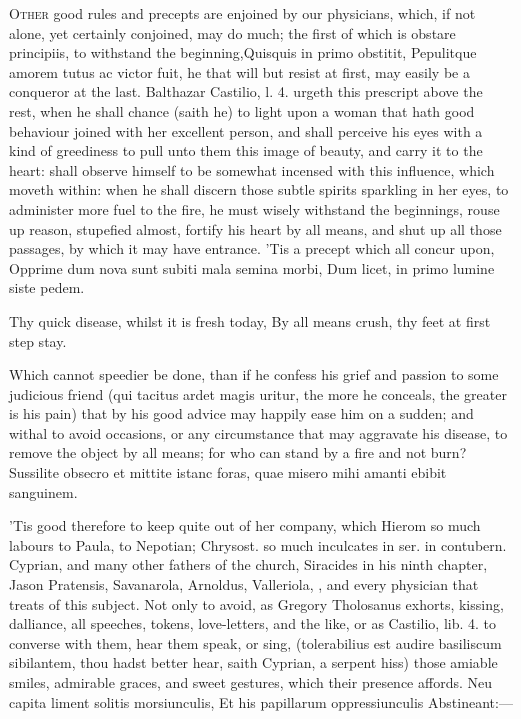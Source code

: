 {\lettrine{O}{ther} good rules and precepts are enjoined by our physicians, which, if
not alone, yet certainly conjoined, may do much; the first of which is
obstare principiis, to withstand the beginning,Quisquis in primo
obstitit, Pepulitque amorem tutus ac victor fuit, he that will but
resist at first, may easily be a conqueror at the last. Balthazar
Castilio, l. 4. urgeth this prescript above the rest, when he
shall chance (saith he) to light upon a woman that hath good behaviour
joined with her excellent person, and shall perceive his eyes with a
kind of greediness to pull unto them this image of beauty, and carry it
to the heart: shall observe himself to be somewhat incensed with this
influence, which moveth within: when he shall discern those subtle
spirits sparkling in her eyes, to administer more fuel to the fire, he
must wisely withstand the beginnings, rouse up reason, stupefied
almost, fortify his heart by all means, and shut up all those passages,
by which it may have entrance. 'Tis a precept which all concur upon,
Opprime dum nova sunt subiti mala semina morbi,
Dum licet, in primo lumine siste pedem.

Thy quick disease, whilst it is fresh today,
By all means crush, thy feet at first step stay.

Which cannot speedier be done, than if he confess his grief and passion
to some judicious friend (qui tacitus ardet magis uritur, the
more he conceals, the greater is his pain) that by his good advice may
happily ease him on a sudden; and withal to avoid occasions, or any
circumstance that may aggravate his disease, to remove the object by
all means; for who can stand by a fire and not burn?
Sussilite obsecro et mittite istanc foras,
quae misero mihi amanti ebibit sanguinem.

'Tis good therefore to keep quite out of her company, which Hierom so
much labours to Paula, to Nepotian; Chrysost. so much inculcates in
ser. in contubern. Cyprian, and many other fathers of the church,
Siracides in his ninth chapter, Jason Pratensis, Savanarola, Arnoldus,
Valleriola, \etc{}, and every physician that treats of this subject. Not
only to avoid, as  Gregory Tholosanus exhorts, kissing,
dalliance, all speeches, tokens, love-letters, and the like, or as
Castilio, lib. 4. to converse with them, hear them speak, or sing,
(tolerabilius est audire basiliscum sibilantem, thou hadst better hear,
saith Cyprian, a serpent hiss) those amiable smiles,
admirable graces, and sweet gestures, which their presence affords.
Neu capita liment solitis morsiunculis,
Et his papillarum oppressiunculis
Abstineant:---

}
